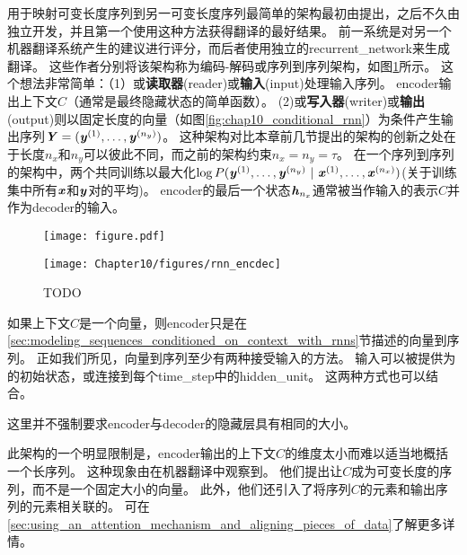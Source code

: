 用于映射可变长度序列到另一可变长度序列最简单的架构最初由\cite{cho-al-emnlp14}提出，之后不久由\cite{Sutskever-et-al-NIPS2014}独立开发，并且第一个使用这种方法获得翻译的最好结果。
前一系统是对另一个机器翻译系统产生的建议进行评分，而后者使用独立的\gls{recurrent_network}来生成翻译。
这些作者分别将该架构称为编码-解码或序列到序列架构，如图\ref{fig:chap10_rnn_encdec}所示。
这个想法非常简单：（1）或\textbf{读取器}(reader)或\textbf{输入}(input)处理输入序列。
\gls{encoder}输出上下文$C$（通常是最终隐藏状态的简单函数）。
(2)或\textbf{写入器}(writer)或\textbf{输出}(output)则以固定长度的向量（如图\ref{fig:chap10_conditional_rnn}）为条件产生输出序列$\boldsymbol{\mathit{Y}}=(\boldsymbol{\mathit{y}}^{(1)}, \dots, \boldsymbol{\mathit{y}}^{(n_y)})$。
这种架构对比本章前几节提出的架构的创新之处在于长度$n_x$和$n_y$可以彼此不同，而之前的架构约束$n_x = n_y = \tau$。
在一个序列到序列的架构中，两个共同训练以最大化$\log P( \boldsymbol{\mathit{y}}^{(1)}, \dots, \boldsymbol{\mathit{y}}^{(n_y)} ~|~ \boldsymbol{\mathit{x}}^{(1)},\dots,\boldsymbol{\mathit{x}}^{(n_x)} )$(关于训练集中所有$\boldsymbol{\mathit{x}}$和$\boldsymbol{\mathit{y}}$对的平均)。
\gls{encoder}的最后一个状态$\boldsymbol{\mathit{h}}_{n_x}$通常被当作输入的表示$C$并作为\gls{decoder}的输入。

\begin{figure}[!htb]
\ifOpenSource
\centerline{\texttt{[image: figure.pdf]}}
\else
\centerline{\texttt{[image: Chapter10/figures/rnn\_encdec]}}
\fi
\caption{TODO}
\label{fig:chap10_rnn_encdec}
\end{figure}

如果上下文$C$是一个向量，则\gls{encoder}只是在\ref{sec:modeling_sequences_conditioned_on_context_with_rnns}节描述的向量到序列。
正如我们所见，向量到序列至少有两种接受输入的方法。
输入可以被提供为的初始状态，或连接到每个\gls{time_step}中的\gls{hidden_unit}。
这两种方式也可以结合。

这里并不强制要求\gls{encoder}与\gls{decoder}的隐藏层具有相同的大小。

此架构的一个明显限制是，\gls{encoder}输出的上下文$C$的维度太小而难以适当地概括一个长序列。
这种现象由\cite{Bahdanau-et-al-ICLR2015-small}在机器翻译中观察到。
他们提出让$C$成为可变长度的序列，而不是一个固定大小的向量。
此外，他们还引入了将序列$C$的元素和输出序列的元素相关联的。
可在\ref{sec:using_an_attention_mechanism_and_aligning_pieces_of_data}了解更多详情。


